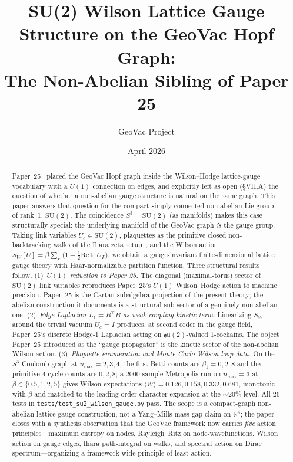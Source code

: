 \documentclass[11pt]{article}
\title{SU(2) Wilson Lattice Gauge Structure on the GeoVac Hopf Graph:\\
The Non-Abelian Sibling of Paper 25}
\author{GeoVac Project}
\date{April 2026}
\begin{document}
\maketitle

\begin{abstract}
Paper~25~\cite{paper25} placed the GeoVac Hopf graph inside the
Wilson--Hodge lattice-gauge vocabulary with a $U(1)$ connection on
edges, and explicitly left as open (\S VII.A) the question of whether
a non-abelian gauge structure is natural on the same graph.  This paper
answers that question for the compact simply-connected non-abelian Lie
group of rank~1, $\mathrm{SU}(2)$.  The coincidence $S^3 =
\mathrm{SU}(2)$ (as manifolds) makes this case structurally special:
the underlying manifold of the GeoVac graph \emph{is} the gauge group.
Taking link variables $U_e \in \mathrm{SU}(2)$, plaquettes as the
primitive closed non-backtracking walks of the Ihara zeta
setup~\cite{paper29}, and the Wilson action
$S_W[U] = \beta \sum_P \bigl(1 - \tfrac{1}{2}\mathrm{Re}\,\mathrm{tr}\,
U_P\bigr)$, we obtain a gauge-invariant finite-dimensional lattice
gauge theory with Haar-normalizable partition function.
Three structural results follow.
(1)~\emph{$U(1)$ reduction to Paper 25.}  The diagonal (maximal-torus)
sector of $\mathrm{SU}(2)$ link variables reproduces Paper~25's
$U(1)$ Wilson--Hodge action to machine precision.  Paper~25 is the
Cartan-subalgebra projection of the present theory; the abelian
construction it documents is a structural sub-sector of a genuinely
non-abelian one.
(2)~\emph{Edge Laplacian $L_1 = B^{\top} B$ as weak-coupling kinetic
term.}  Linearizing $S_W$ around the trivial vacuum $U_e = I$
produces, at second order in the gauge field, Paper~25's discrete
Hodge-1 Laplacian acting on $\mathfrak{su}(2)$-valued $1$-cochains.
The object Paper~25 introduced as the ``gauge propagator'' is the
kinetic sector of the non-abelian Wilson action.
(3)~\emph{Plaquette enumeration and Monte Carlo Wilson-loop data.}
On the $S^3$ Coulomb graph at $n_{\max} = 2, 3, 4$, the first-Betti
counts are $\beta_1 = 0, 2, 8$ and the primitive 4-cycle counts are
$0, 2, 8$; a 2000-sample Metropolis run on $n_{\max} = 3$ at $\beta
\in \{0.5, 1, 2, 5\}$ gives Wilson expectations $\langle W \rangle =
0.126, 0.158, 0.332, 0.681$, monotonic with $\beta$ and
matched to the leading-order character expansion at the $\sim 20\%$
level.  All 26 tests in \texttt{tests/test\_su2\_wilson\_gauge.py}
pass.
The scope is a compact-graph non-abelian lattice gauge construction,
not a Yang--Mills mass-gap claim on $\mathbb{R}^4$; the paper closes
with a synthesis observation that the GeoVac framework now carries
\emph{five} action principles---maximum entropy on nodes, Rayleigh--Ritz
on node-wavefunctions, Wilson action on gauge edges, Ihara path-integral
on walks, and spectral action on Dirac spectrum---organizing a
framework-wide principle of least action.
\end{abstract}
\end{document}
